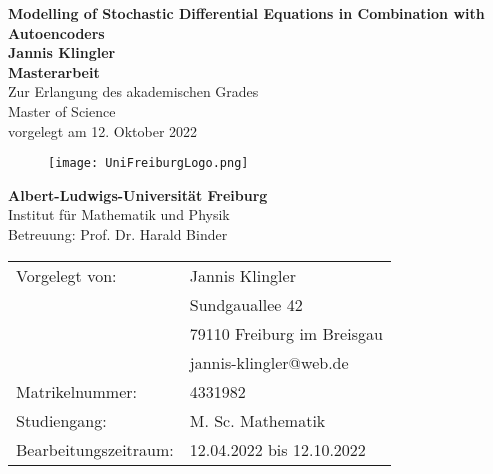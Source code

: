 \documentclass[11pt,titlepage]{article}
\theoremstyle{definition}
\theoremstyle{remark}
\begin{document}
	\setlength{\parindent}{0em}
	\onehalfspacing
	\begin{titlepage}
		\begin{center}
			\huge\textbf{Modelling of Stochastic Differential Equations in Combination 
			with Autoencoders}\\
			\vspace{1.2cm}
			\LARGE\textbf{{Jannis Klingler}}\\
			\vspace{0.5cm}
			\LARGE\textbf{{Masterarbeit}}\\
			\vspace{0.5cm}
			\normalsize
			Zur Erlangung des akademischen Grades\\
			Master of Science\\
			\vspace{0.3cm}
			vorgelegt am 12. Oktober 2022 \\
			\vspace{0.7cm}
			
			\begin{figure}[h!]
				\centering
				\texttt{[image: UniFreiburgLogo.png]}
			\end{figure}
			
			\vspace{0.7cm}
			\large \textbf{Albert-Ludwigs-Universität Freiburg}\\
			\vspace{0.2cm}
			\large {Institut für Mathematik und Physik}\\
			\large {Betreuung: Prof. Dr. Harald Binder}\\
			\vspace{1.8cm}
		\end{center}
	\end{titlepage}
	
	\thispagestyle{empty}
	\vspace*{17cm}
	\begin{tabular}{ll}
		Vorgelegt von: & Jannis Klingler \\
		& Sundgauallee 42\\
		& 79110 Freiburg im Breisgau
		\\
		& jannis-klingler@web.de\\
		Matrikelnummer: & {4331982} \\
		Studiengang: & {M. Sc. Mathematik}\\
		Bearbeitungszeitraum: & {12.04.2022 bis 12.10.2022} \\
	\end{tabular}\\
	
\end{document}

